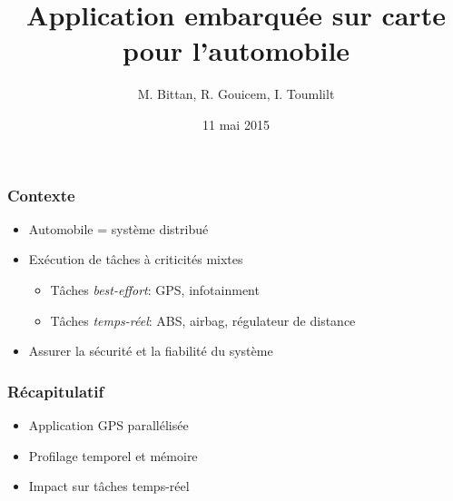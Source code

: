 \documentclass{beamer}
\title[Soutenance PSAR]{Application embarquée sur carte pour l'automobile} %
\author{M. Bittan, R. Gouicem, I. Toumlilt} %
\institute[UPMC] %
{
UPMC \\ %
\medskip
\textit{} %
}
\date{11 mai 2015} %
\begin{document}
\begin{frame}
\titlepage %
\end{frame}

\begin{frame}
\frametitle{Contexte}
\begin{itemize}
  \item Automobile = système distribué
    \vspace{1em}
  \item Exécution de tâches à criticités mixtes
    \begin{itemize}
      \item Tâches \textit{best-effort}: GPS, infotainment
      \item Tâches \textit{temps-réel}: ABS, airbag, régulateur de distance
    \end{itemize}
    \vspace{1em}
  \item Assurer la sécurité et la fiabilité du système
\end{itemize}
\end{frame}









\begin{frame}
\frametitle{Récapitulatif}
\begin{itemize}
  \item Application GPS parallélisée
    \vspace{1em}
  \item Profilage temporel et mémoire
    \vspace{1em}
  \item Impact sur tâches temps-réel
\end{itemize}
\end{frame}
\end{document}
